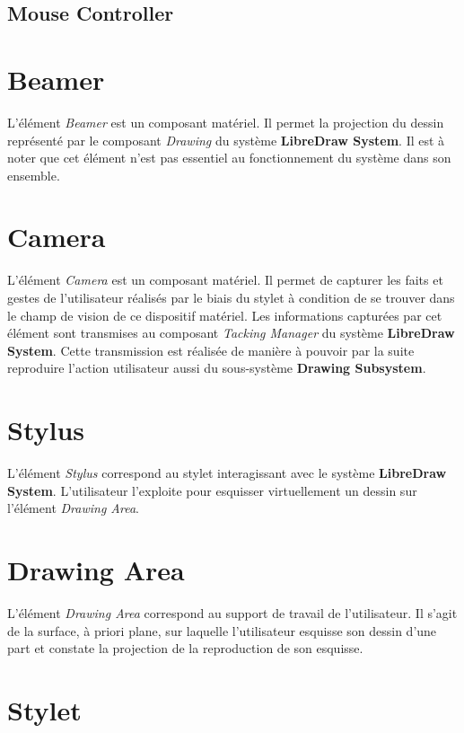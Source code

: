 \documentclass[11pt,a4paper,oldfontcommands]{memoir}
\begin{document}
\subsection{Mouse Controller}

\newpage

\section{Beamer}

L'élément \textit{Beamer} est un composant matériel. Il permet la projection du dessin représenté par le composant \textit{Drawing} du système \textbf{LibreDraw System}. Il est à noter que cet élément n'est pas essentiel au fonctionnement du système dans son ensemble.

\section{Camera}

L'élément \textit{Camera} est un composant matériel. Il permet de capturer les faits et gestes de l'utilisateur réalisés par le biais du stylet à condition de se trouver dans le champ de vision de ce dispositif matériel. Les informations capturées par cet élément sont transmises au composant \textit{Tacking Manager} du système \textbf{LibreDraw System}. Cette transmission est réalisée de manière à pouvoir par la suite reproduire l'action utilisateur aussi du sous-système \textbf{Drawing Subsystem}.

\section{Stylus}

L'élément \textit{Stylus} correspond au stylet interagissant avec le système \textbf{LibreDraw System}. L'utilisateur l'exploite pour esquisser virtuellement un dessin sur l'élément \textit{Drawing Area}.

\section{Drawing Area}

L'élément \textit{Drawing Area} correspond au support de travail de l'utilisateur. Il s'agit de la surface, à priori plane, sur laquelle l'utilisateur esquisse son dessin d'une part et constate la projection de la reproduction de son esquisse.

\section{Stylet}
\end{document}
